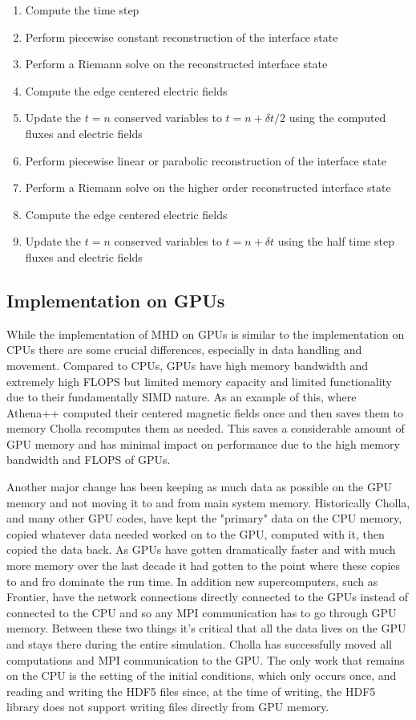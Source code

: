 \begin{enumerate}
    \item Compute the time step
    \item Perform piecewise constant reconstruction of the interface state
    \item Perform a Riemann solve on the reconstructed interface state
    \item Compute the edge centered electric fields
    \item Update the $t=n$ conserved variables to $t=n+\delta t/2$ using the computed fluxes and electric fields
    \item Perform piecewise linear or parabolic reconstruction of the interface state
    \item Perform a Riemann solve on the higher order reconstructed interface state
    \item Compute the edge centered electric fields
    \item Update the $t=n$ conserved variables to $t=n+\delta t$ using the half time step fluxes and electric fields
\end{enumerate}

\subsection{Implementation on GPUs}

While the implementation of MHD on GPUs is similar to the implementation on CPUs there are some crucial differences, especially in data handling and movement. Compared to CPUs, GPUs have high memory bandwidth and extremely high FLOPS but limited memory capacity and limited functionality due to their fundamentally SIMD nature. As an example of this, where Athena++ computed their centered magnetic fields once and then saves them to memory Cholla recomputes them as needed. This saves a considerable amount of GPU memory and has minimal impact on performance due to the high memory bandwidth and FLOPS of GPUs.

Another major change has been keeping as much data as possible on the GPU memory and not moving it to and from main system memory. Historically Cholla, and many other GPU codes, have kept the "primary" data on the CPU memory, copied whatever data needed worked on to the GPU, computed with it, then copied the data back. As GPUs have gotten dramatically faster and with much more memory over the last decade it had gotten to the point where these copies to and fro dominate the run time. In addition new supercomputers, such as Frontier, have the network connections directly connected to the GPUs instead of connected to the CPU and so any MPI communication has to go through GPU memory. Between these two things it's critical that all the data lives on the GPU and stays there during the entire simulation. Cholla has successfully moved all computations and MPI communication to the GPU. The only work that remains on the CPU is the setting of the initial conditions, which only occurs once, and reading and writing the HDF5 files since, at the time of writing, the HDF5 library does not support writing files directly from GPU memory.

